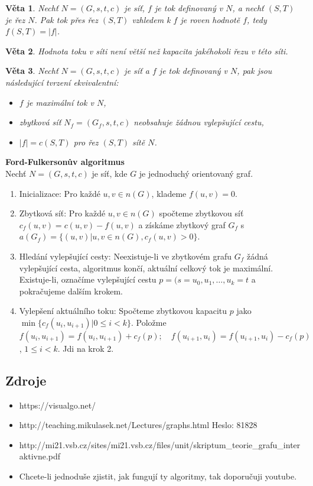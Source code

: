 \documentclass[a4]{report}
\newtheorem{theorem}{Věta}
\theoremstyle{definition}
\begin{document}
\begin{theorem}
Nechť $N=(G,s,t,c)$ je síť, $f$ je tok definovaný v $N$, a nechť $(S,T)$ je řez $N$. Pak tok přes řez $(S,T)$ vzhledem k $f$ je roven hodnotě $f$, tedy $f(S,T) = |f|$.
\end{theorem}

\begin{theorem}
Hodnota toku v síti není větší než kapacita jakéhokoli řezu v této síti.
\end{theorem}

\begin{theorem}
    Nechť $N=(G,s,t,c)$ je síť a $f$ je tok definovaný v $N$, pak jsou následující tvrzení ekvivalentní:
    \begin{itemize}
        \item $f$ je maximální tok v $N$,
        \item zbytková síť $N_f = (G_f, s, t, c)$ neobsahuje žádnou vylepšující cestu,
        \item $|f| = c(S,T)$ pro řez $(S,T)$ sítě $N$.
    \end{itemize}
\end{theorem}

\textbf{Ford-Fulkersonův algoritmus}\\
Nechť $N=(G,s,t,c)$ je síť, kde $G$ je jednoduchý orientovaný graf.
\begin{enumerate}
    \item Inicializace: Pro každé $u, v \in n(G)$, klademe $f(u,v) = 0$.
    \item Zbytková síť: Pro každé $u, v \in n(G)$ spočteme zbytkovou síť $c_f(u,v) = c(u,v) - f(u,v)$ a získáme zbytkový graf $G_f$ s $a(G_f) = \{ (u,v) | u,v \in n(G), c_f(u,v) > 0 \}$.    
    \item Hledání vylepšující cesty: Neexistuje-li ve zbytkovém grafu $G_f$ žádná vylepšující cesta, algoritmus končí, aktuální celkový tok je maximální. Existuje-li, označíme vylepšující cestu $p = (s = u_0, u_1, \ldots, u_k = t$ a pokračujeme dalším krokem.
    \item Vylepšení aktuálního toku: Spočteme zbytkovou kapacitu $p$ jako $\min \{ c_f(u_i, u_{i+1}) | 0 \leq i < k \}$. Položme $f(u_i,u_{i+1})=f(u_i,u_{i+1})+c_f(p);\quad f(u_{i+1},u_i)=f(u_{i+1},u_i)-c_f(p)$, $1 \leq i < k$. Jdi na krok 2.
\end{enumerate}

\subsection{Zdroje}
\begin{itemize}
    \item https://visualgo.net/ 
    \item http://teaching.mikulasek.net/Lectures/graphs.html Heslo: 81828
    \item http://mi21.vsb.cz/sites/mi21.vsb.cz/files/unit/skriptum\_teorie\_grafu\_interaktivne.pdf
    \item Chcete-li jednoduše zjistit, jak fungují ty algoritmy, tak doporučuji youtube.
\end{itemize}
\end{document}
